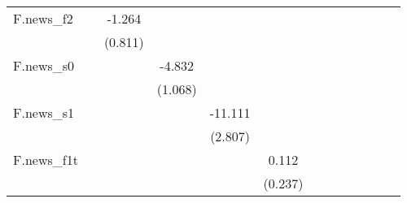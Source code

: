 {\begin{tabular}{l*{12}{c}}
\addlinespace
F.news\_f2   &                     &      -1.264         &                     &                     &                     &                     &                     &                     &                     &                     &                     &                     \\
            &                     &     (0.811)         &                     &                     &                     &                     &                     &                     &                     &                     &                     &                     \\
\addlinespace
F.news\_s0   &                     &                     &      -4.832\sym{***}&                     &                     &                     &                     &                     &                     &                     &                     &                     \\
            &                     &                     &     (1.068)         &                     &                     &                     &                     &                     &                     &                     &                     &                     \\
\addlinespace
F.news\_s1   &                     &                     &                     &     -11.111\sym{***}&                     &                     &                     &                     &                     &                     &                     &                     \\
            &                     &                     &                     &     (2.807)         &                     &                     &                     &                     &                     &                     &                     &                     \\
\addlinespace
F.news\_f1t  &                     &                     &                     &                     &       0.112         &                     &                     &                     &                     &                     &                     &                     \\
            &                     &                     &                     &                     &     (0.237)         &                     &                     &                     &                     &                     &                     &                     \\

\end{tabular}}
